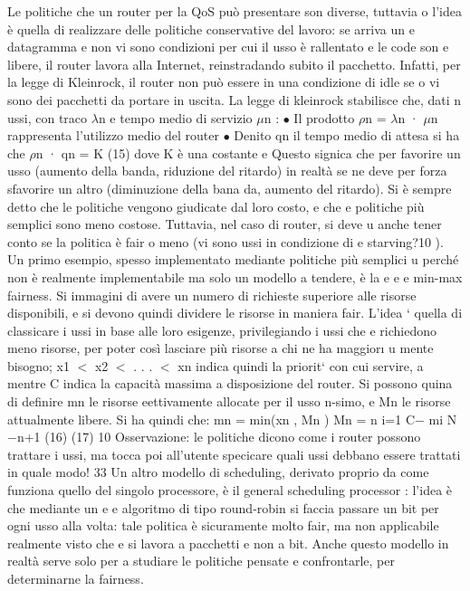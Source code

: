 \documentclass[a4paper,12pt]{article}
\begin{document}
Le politiche che un router per la QoS può presentare son diverse, tuttavia
o
l'idea è quella di realizzare delle politiche conservative del lavoro: se arriva un
e
datagramma e non vi sono condizioni per cui il usso è rallentato e le code son
e
libere, il router lavora alla Internet, reinstradando subito il pacchetto. Infatti,
per la legge di Kleinrock, il router non può essere in una condizione di idle se
o
vi sono dei pacchetti da portare in uscita. La legge di kleinrock stabilisce che,
dati n ussi, con traco $\lambda$n e tempo medio di servizio $\mu$n :
$\bullet$ Il prodotto $\rho$n = $\lambda$n · $\mu$n rappresenta l'utilizzo medio del router
$\bullet$ Denito qn il tempo medio di attesa si ha che
$\rho$n · qn = K
(15)
dove K è una costante
e
Questo signica che per favorire un usso (aumento della banda, riduzione del
ritardo) in realtà se ne deve per forza sfavorire un altro (diminuzione della bana
da, aumento del ritardo).
Si è sempre detto che le politiche vengono giudicate dal loro costo, e che
e
politiche più semplici sono meno costose. Tuttavia, nel caso di router, si deve
u
anche tener conto se la politica è fair o meno (vi sono ussi in condizione di
e
starving?10 ).
Un primo esempio, spesso implementato mediante politiche più semplici
u
perché non è realmente implementabile ma solo un modello a tendere, è la
e
e
e
min-max fairness. Si immagini di avere un numero di richieste superiore alle
risorse disponibili, e si devono quindi dividere le risorse in maniera fair. L'idea
` quella di classicare i ussi in base alle loro esigenze, privilegiando i ussi che
e
richiedono meno risorse, per poter così lasciare più risorse a chi ne ha maggior\i{}
u
mente bisogno; x1 $<$ x2 $<$ . . . $<$ xn indica quindi la priorit` con cui servire,
a
mentre C indica la capacità massima a disposizione del router. Si possono quina
di definire mn le risorse eettivamente allocate per il usso n-simo, e Mn le
risorse attualmente libere. Si ha quindi che:
mn = min(xn , Mn )
Mn =
n
i=1
C$-$
mi
N $-$n+1
(16)
(17)
10 Osservazione: le politiche dicono come i router possono trattare i ussi, ma tocca poi
all'utente specicare quali ussi debbano essere trattati in quale modo!
33
Un altro modello di scheduling, derivato proprio da come funziona quello del
singolo processore, è il general scheduling processor : l'idea è che mediante un
e
e
algoritmo di tipo round-robin si faccia passare un bit per ogni usso alla volta:
tale politica è sicuramente molto fair, ma non applicabile realmente visto che
e
si lavora a pacchetti e non a bit. Anche questo modello in realtà serve solo per
a
studiare le politiche pensate e confrontarle, per determinarne la fairness.
\end{document}
